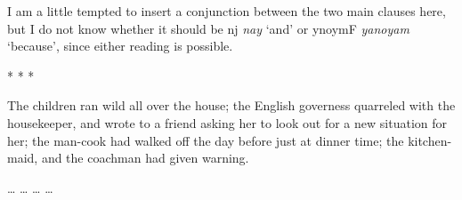 \documentclass[12pt,paper=letter]{scrartcl}
\newcommand{\fw}[1]{\textit{#1}} %
\newcommand{\qq}[1]{\enquote*{#1}} %
\newcommand{\divider}{\vspace{0.5\baselineskip} \centerline{* * *} \vspace{0.5\baselineskip}}
\newcommand{\ayr}[1]{{\Tagati #1}}
\begin{document}
I am a little tempted to insert a conjunction between the two main clauses here,
but I do not know whether it should be \ayr{nj} \fw{nay} \qq{and} or \ayr{ynoymF}
\fw{yanoyam} \qq{because}, since either reading is possible.

\divider

The children ran wild all over the house; the English governess quarreled with the housekeeper, and wrote to a friend asking her to look out for a new situation for her; the man-cook had walked off the day before just at dinner time; the kitchen-maid, and the coachman had given warning.

\begin{exe}  %
    \ex
    \begin{xlist}
	\ex …
	\ex …
	\ex …
	\ex …
    \end{xlist}
\end{exe}


\printbibliography
\end{document}
